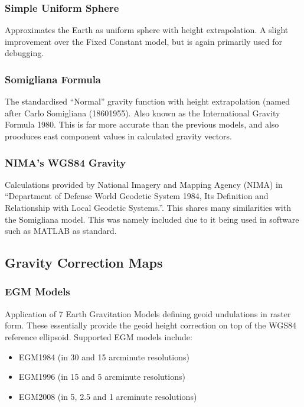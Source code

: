 \documentclass[letterpaper,10pt,english]{sphinxmanual}
\begin{document}
\subsubsection{Simple Uniform Sphere}
\label{\detokenize{usage/gravity_modelling:simple-uniform-sphere}}
\sphinxAtStartPar
Approximates the Earth as uniform sphere with height extrapolation. A slight improvement over the Fixed Constant model,
but is again primarily used for debugging.


\subsubsection{Somigliana Formula}
\label{\detokenize{usage/gravity_modelling:somigliana-formula}}
\sphinxAtStartPar
The standardised “Normal” gravity function with height extrapolation (named after Carlo Somigliana (1860\textendash{}1955). Also
known as the International Gravity Formula 1980. This is far more accurate than the previous models, and also prooduces
east component values in calculated gravity vectors.


\subsubsection{NIMA’s WGS\sphinxhyphen{}84 Gravity}
\label{\detokenize{usage/gravity_modelling:nimas-wgs-84-gravity}}
\sphinxAtStartPar
Calculations provided by National Imagery and Mapping Agency (NIMA) in “Department of Defense World Geodetic System
1984, Its Definition and Relationship with Local Geodetic Systems.”. This shares many similarities with the Somigliana
model. This was namely included due to it being used in software such as MATLAB as standard.


\subsection{Gravity Correction Maps}
\label{\detokenize{usage/gravity_modelling:gravity-correction-maps}}

\subsubsection{EGM Models}
\label{\detokenize{usage/gravity_modelling:egm-models}}
\sphinxAtStartPar
Application of 7 Earth Gravitation Models defining geoid undulations in raster form. These essentially provide the
geoid height correction on top of the WGS\sphinxhyphen{}84 reference ellipsoid. Supported EGM models include:
\begin{itemize}
\item {} 
\sphinxAtStartPar
EGM\sphinxhyphen{}1984 (in 30 and 15 arc\sphinxhyphen{}minute resolutions)

\item {} 
\sphinxAtStartPar
EGM\sphinxhyphen{}1996 (in 15 and 5 arc\sphinxhyphen{}minute resolutions)

\item {} 
\sphinxAtStartPar
EGM\sphinxhyphen{}2008 (in 5, 2.5 and 1 arc\sphinxhyphen{}minute resolutions)

\end{itemize}
\end{document}
